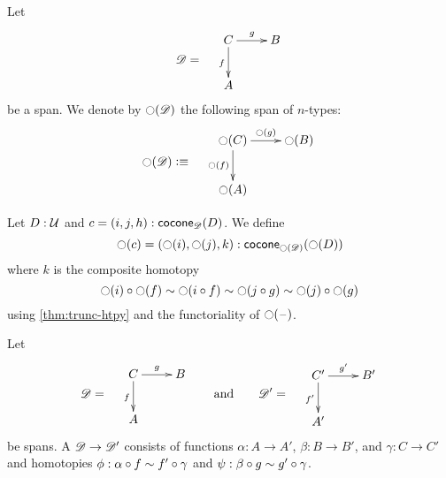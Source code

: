 \documentclass[hott-all.tex]{subfiles}
\begin{document}
% 
% 
% 
\begin{defn}
  Let
  \[\Ddiag=\quad\vcenter{\xymatrix{C \ar^g[r] \ar_f[d] & B \\ A & }}\]
  be a span. We denote by $\ocircle(\mathscr{D})$ the following
  span of $n$-types:
  \[\reflect(\Ddiag)\defeq\quad \vcenter{\xymatrix{\reflect(C) \ar^{\reflect(g)}[r]
      \ar_{\reflect(f)}[d] & \reflect(B) \\ \reflect(A) & }}\]
\end{defn}
% 
\begin{defn}
  Let $D:\mathcal{U}$ and $c=(i,j,h):\mathsf{cocone}_{\mathscr{D}}(D)$.
  We define
  \[\ocircle(c)=(\ocircle(i),\ocircle(j),k):
  \mathsf{cocone}_{\ocircle(\mathscr{D})}(\ocircle(D))\]
  where $k$ is the composite homotopy
  \[ \ocircle(i) \circ \ocircle(f) \sim \ocircle(i\circ f) \sim \ocircle(j\circ g) \sim \ocircle(j) \circ \ocircle(g) \]
  using \cref{thm:trunc-htpy} and the functoriality of $\ocircle(\mathord{\hspace{1pt}\text{--}\hspace{1pt}})$.
\end{defn}
% 
% 
% 
\begin{defn}
  Let
  \[\Ddiag=\quad\vcenter{\xymatrix{C \ar^g[r] \ar_f[d] & B \\ A & }}
  \qquad\text{and}\qquad
  \Ddiag'=\quad\vcenter{\xymatrix{C' \ar^{g'}[r] \ar_{f'}[d] & B' \\ A' & }}
  \]
  be spans.
  A 
  $\mathscr{D} \to \mathscr{D}'$ consists of functions $\alpha:A\to A'$, $\beta:B\to B'$, and $\gamma:C\to C'$ and homotopies $\phi: \alpha\circ f \sim f'\circ \gamma$ and $\psi:\beta\circ g \sim g' \circ \gamma$.
\end{defn}
% 
% 
\end{document}
